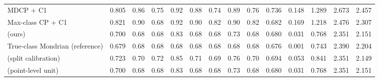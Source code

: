 \begin{table}[!htbp]
{\begin{tabular}{lccccccccccccc}
MDCP + C1 & 0.805 & 0.86 & 0.75 & 0.92 & 0.88 & 0.74 & 0.89 & 0.76 & 0.736 & 0.148 & 1.289 & 2.673 & 2.457 \\
Max-class CP + C1 & 0.821 & 0.90 & 0.68 & 0.92 & 0.90 & 0.82 & 0.90 & 0.82 & 0.682 & 0.169 & 1.218 & 2.476 & 2.307 \\
\gamut{} (ours) & 0.700 & 0.68 & 0.68 & 0.83 & 0.68 & 0.68 & 0.73 & 0.68 & 0.680 & 0.031 & 0.768 & 2.351 & 2.151 \\
True-class Mondrian (reference) & 0.679 & 0.68 & 0.68 & 0.68 & 0.68 & 0.68 & 0.68 & 0.68 & 0.676 & 0.001 & 0.743 & 2.390 & 2.204 \\
\gamut{} (split calibration) & 0.723 & 0.70 & 0.72 & 0.85 & 0.71 & 0.69 & 0.76 & 0.70 & 0.694 & 0.053 & 0.841 & 2.351 & 2.149 \\
\gamut{} (point-level unit) & 0.700 & 0.68 & 0.68 & 0.83 & 0.68 & 0.68 & 0.73 & 0.68 & 0.680 & 0.031 & 0.768 & 2.351 & 2.151 \\
\bottomrule
\end{tabular}}
\end{table}

